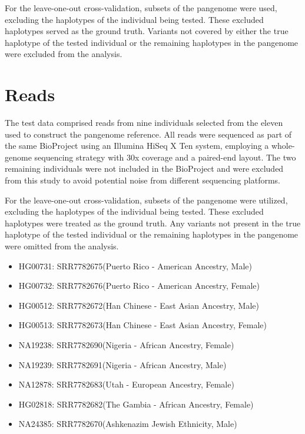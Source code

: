 \documentclass[PhD]{PHlab-thesis}
\begin{document}
For the leave-one-out cross-validation, subsets of the pangenome were used, excluding the haplotypes of the individual being tested. These excluded haplotypes served as the ground truth. Variants not covered by either the true haplotype of the tested individual or the remaining haplotypes in the pangenome were excluded from the analysis.

\section{Reads}
The test data comprised reads from nine individuals selected from the eleven used to construct the pangenome reference. All reads were sequenced as part of the same BioProject using an Illumina HiSeq X Ten system, employing a whole-genome sequencing strategy with 30x coverage and a paired-end layout. The two remaining individuals were not included in the BioProject and were excluded from this study to avoid potential noise from different sequencing platforms. 

For the leave-one-out cross-validation, subsets of the pangenome were utilized, excluding the haplotypes of the individual being tested. These excluded haplotypes were treated as the ground truth. Any variants not present in the true haplotype of the tested individual or the remaining haplotypes in the pangenome were omitted from the analysis.

\vspace{2em}

\begin{itemize}
    \item HG00731: SRR7782675(Puerto Rico - American Ancestry, Male)
    \item HG00732: SRR7782676(Puerto Rico - American Ancestry, Female)
    \item HG00512: SRR7782672(Han Chinese - East Asian Ancestry, Male)
    \item HG00513: SRR7782673(Han Chinese - East Asian Ancestry, Female)
    \item NA19238: SRR7782690(Nigeria - African Ancestry, Female)
    \item NA19239: SRR7782691(Nigeria - African Ancestry, Male)
    \item NA12878: SRR7782683(Utah - European Ancestry, Female)
    \item HG02818: SRR7782682(The Gambia - African Ancestry, Female)
    \item NA24385: SRR7782670(Ashkenazim Jewish Ethnicity, Male)
\end{itemize}
\vspace{2em}
\end{document}

